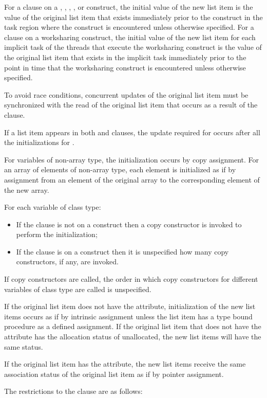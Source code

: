 For a  clause on a , ,
, , or  construct, the initial
value of the new list item is the value of the original list item that
exists immediately prior to the construct in the task region where the
construct is encountered unless otherwise specified. For a
 clause on a worksharing construct, the initial
value of the new list item for each implicit task of the threads that
execute the worksharing construct is the value of the original list
item that exists in the implicit task immediately prior to the point
in time that the worksharing construct is encountered unless otherwise
specified.

To avoid race conditions, concurrent updates of the original list item must be
synchronized with the read of the original list item that occurs as a result of the
 clause.

If a list item appears in both  and  clauses, the update
required for  occurs after all the initializations for .

\begin{ccppspecific}
For variables of non-array type, the initialization occurs by copy assignment. For an
array of elements of non-array type, each element is initialized as if by assignment from
an element of the original array to the corresponding element of the new array.
\end{ccppspecific}
%
\begin{cppspecific}
For each variable of class type:
\begin{itemize}
\item If the  clause is not on a  construct then a copy constructor is invoked to perform the initialization;
\item If the  clause is on a  construct then it is unspecified how many copy constructors, if any, are invoked.
\end{itemize}
If copy constructors are called, the order in which copy constructors for different variables of class type are called is unspecified.
\end{cppspecific}
%
\begin{fortranspecific}
If the original list item does not have the  attribute,
initialization of the new list items occurs as if by intrinsic
assignment unless the list item has a type bound procedure as a
defined assignment.  If the original list item that does not have the
 attribute has the allocation status of unallocated, the
new list items will have the same status.

If the original list item has the  attribute, the new list items receive the same
association status of the original list item as if by pointer assignment.
\end{fortranspecific}
%
\restrictions
The restrictions to the  clause are as follows:

